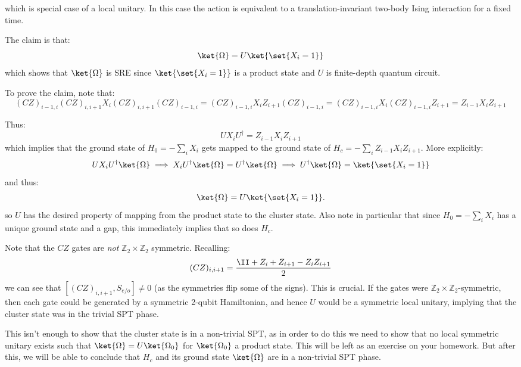 which is special case of a local unitary. In this case the action is equivalent to a translation-invariant two-body Ising interaction for a fixed time.

The claim is that:
\begin{equation}
    \ket{\Omega} = U\ket{\set{X_i = 1}}
\end{equation}
which shows that $\ket{\Omega}$ is SRE since $\ket{\set{X_i = 1}}$ is a product state and $U$ is finite-depth quantum circuit.

To prove the claim, note that:
\begin{equation}
    (CZ)_{i-1, i}(CZ)_{i, i+1}X_i(CZ)_{i, i+1}(CZ)_{i-1, i} = (CZ)_{i-1, i}X_i Z_{i+1}(CZ)_{i-1, i} = (CZ)_{i-1, i}X_i (CZ)_{i-1, i}Z_{i+1} = Z_{i-1}X_iZ_{i+1}
\end{equation}

Thus:
\begin{equation}
    UX_i U^\dag = Z_{i-1}X_iZ_{i+1}
\end{equation}
which implies that the ground state of $H_0 = -\sum_i X_i$ gets mapped to the ground state of $H_c = -\sum_i Z_{i-1}X_iZ_{i+1}$. More explicitly:
\begin{equation}
    UX_iU^\dagger \ket{\Omega} \implies X_i U^\dagger \ket{\Omega} = U^\dag \ket{\Omega} \implies U^\dag \ket{\Omega} = \ket{\set{X_i = 1}}
\end{equation}
and thus:
\begin{equation}
    \ket{\Omega} = U\ket{\set{X_i = 1}}.
\end{equation}
so $U$ has the desired property of mapping from the product state to the cluster state. Also note in particular that since $H_0 = -\sum_i X_i$ has a unique ground state and a gap, this immediately implies that so does $H_c$.

Note that the $CZ$ gates are \emph{not} $\mathbb{Z}_2 \times \mathbb{Z}_2$ symmetric. Recalling:
\begin{equation}
    (CZ)_{i, i+1} = \frac{\II + Z_i + Z_{i+1} - Z_iZ_{i+1}}{2}
\end{equation}
we can see that $[(CZ)_{i, i+1}, S_{e/o}] \neq 0$ (as the symmetries flip some of the signs). This is crucial. If the gates were $\mathbb{Z}_2 \times \mathbb{Z}_2$-symmetric, then each gate could be generated by a symmetric 2-qubit Hamiltonian, and hence $U$ would be a symmetric local unitary, implying that the cluster state was in the trivial SPT phase.

This isn't enough to show that the cluster state is in a non-trivial SPT, as in order to do this we need to show that no local symmetric unitary exists such that $\ket{\Omega} = U\ket{\Omega_0}$ for $\ket{\Omega_0}$ a product state. This will be left as an exercise on your homework. But after this, we will be able to conclude that $H_c$ and its ground state $\ket{\Omega}$ are in a non-trivial SPT phase.

